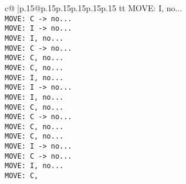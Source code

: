 \documentclass{article}
\begin{document}
{\begin{supertabular}{c@{$\;$}|p{.15\linewidth}@{}p{.15\linewidth}p{.15\linewidth}p{.15\linewidth}p{.15\linewidth}p{.15\linewidth}}
{{{tt  MOVE: I, no...\\ \tt  MOVE: C -> no...\\ \tt  MOVE: I -> no...\\ \tt  MOVE: I, no...\\ \tt  MOVE: C -> no...\\ \tt  MOVE: C, no...\\ \tt  MOVE: C, no...\\ \tt  MOVE: I, no...\\ \tt  MOVE: I -> no...\\ \tt  MOVE: I, no...\\ \tt  MOVE: C, no...\\ \tt  MOVE: C -> no...\\ \tt  MOVE: C, no...\\ \tt  MOVE: C, no...\\ \tt  MOVE: I -> no...\\ \tt  MOVE: C -> no...\\ \tt  MOVE: I, no...\\ \tt  MOVE: C, }}}
\end{supertabular}}
\end{document}
